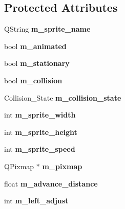\subsection*{Protected Attributes}
\begin{DoxyCompactItemize}
\item 
\mbox{\label{class_sprite_a7255ed65d71ab4a5dac9ad60d3df19b9}} 
Q\+String {\bfseries m\+\_\+sprite\+\_\+name}
\item 
\mbox{\label{class_sprite_ad9cb2135f3b3d7ca71b3ebdef7b46c56}} 
bool {\bfseries m\+\_\+animated}
\item 
\mbox{\label{class_sprite_a23d8bfff2dcbe87094e8eb625c3497ec}} 
bool {\bfseries m\+\_\+stationary}
\item 
\mbox{\label{class_sprite_a38a7b0f7ae13e13468307dabd7bc0b1c}} 
bool {\bfseries m\+\_\+collision}
\item 
\mbox{\label{class_sprite_a5dd4426e4ffce9fd4b5038205d8ca4e4}} 
Collision\+\_\+\+State {\bfseries m\+\_\+collision\+\_\+state}
\item 
\mbox{\label{class_sprite_a491078bf7e9b7fce4f879cec717730a3}} 
int {\bfseries m\+\_\+sprite\+\_\+width}
\item 
\mbox{\label{class_sprite_a24e431a38ed3550f6159c38eedf3b040}} 
int {\bfseries m\+\_\+sprite\+\_\+height}
\item 
\mbox{\label{class_sprite_a02e24d304f28386e583db76033c90807}} 
int {\bfseries m\+\_\+sprite\+\_\+speed}
\item 
\mbox{\label{class_sprite_a623b2ec261659d243b10b4cc2e4207bf}} 
Q\+Pixmap $\ast$ {\bfseries m\+\_\+pixmap}
\item 
\mbox{\label{class_sprite_abfb8dabc8cd79ae3101d50d87e8a356c}} 
float {\bfseries m\+\_\+advance\+\_\+distance}
\item 
\mbox{\label{class_sprite_aecb4f20e0c6ac5c0e4ca13ebd2ad019d}} 
int {\bfseries m\+\_\+left\+\_\+adjust}
\item 

\end{DoxyCompactItemize}
